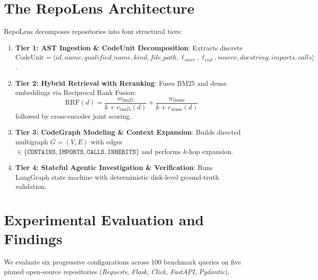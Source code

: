 \documentclass[sigconf,screen]{acmart}
\begin{document}
\section{The RepoLens Architecture}
RepoLens decomposes repositories into four structural tiers:
\begin{enumerate}
    \item \textbf{Tier 1: AST Ingestion \& CodeUnit Decomposition}: Extracts discrete $\text{CodeUnit} = \langle id, name, qualified\_name, kind, file\_path, \ell_{start}, \ell_{end}, source, docstring, imports, calls \rangle$.
    \item \textbf{Tier 2: Hybrid Retrieval with Reranking}: Fuses BM25 and dense embeddings via Reciprocal Rank Fusion:
    \begin{equation}
    \text{RRF}(d) = \frac{w_{\text{bm25}}}{k + r_{\text{bm25}}(d)} + \frac{w_{\text{dense}}}{k + r_{\text{dense}}(d)}
    \end{equation}
    followed by cross-encoder joint scoring.
    \item \textbf{Tier 3: CodeGraph Modeling \& Context Expansion}: Builds directed multigraph $G=(V, E)$ with edges $\in \{\texttt{CONTAINS}, \texttt{IMPORTS}, \texttt{CALLS}, \texttt{INHERITS}\}$ and performs $k$-hop expansion.
    \item \textbf{Tier 4: Stateful Agentic Investigation \& Verification}: Runs LangGraph state machine with deterministic disk-level ground-truth validation.
\end{enumerate}

\section{Experimental Evaluation and Findings}
We evaluate six progressive configurations across 100 benchmark queries on five pinned open-source repositories (\textit{Requests}, \textit{Flask}, \textit{Click}, \textit{FastAPI}, \textit{Pydantic}).
\end{document}
